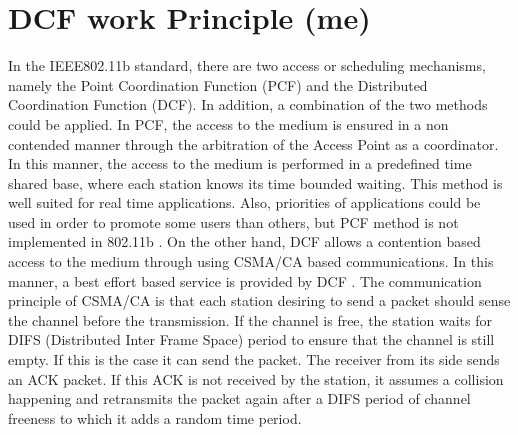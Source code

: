 \documentclass[journal,transmag]{IEEEtran}
\begin{document}
\section{DCF work Principle (me)}
\label{DCF and its problems}
In the IEEE802.11b standard, there are two access or scheduling mechanisms, namely the Point Coordination Function (PCF) and the Distributed Coordination Function (DCF). In addition, a combination of the two methods could be applied. In PCF, the access to the medium is ensured in a non contended manner through the arbitration of the Access Point as a coordinator. In this manner, the access to the medium is performed in a predefined time shared base, where each station knows its time bounded waiting. This method is well suited for real time applications. Also, priorities of applications could be used in order to promote some users than others, but PCF method is not implemented in 802.11b \cite{03performance_anomaly_DCF}. On the other hand, DCF allows a contention based access to the medium through using CSMA/CA based communications. In this manner, a best effort based service is provided by DCF \cite{03performance_anomaly_DCF}. The communication principle of CSMA/CA is that each station desiring to send a packet should sense the channel before the transmission. If the channel is free, the station waits for DIFS (Distributed Inter Frame Space) period to ensure that the channel is still empty. If this is the case it can send the packet. The receiver from its side sends an ACK packet. If this ACK is not received by the station, it assumes a collision happening and retransmits the packet again after a DIFS period of channel freeness to which it adds a random time period. \\
\end{document}
